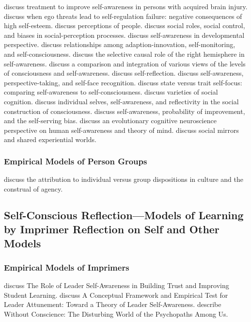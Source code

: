 \cite{goverover2007tis} discuss treatment to improve self-awareness in persons with acquired brain injury.
\cite{baumeister1993etl} discuss when ego threats lead to self-regulation failure: negative consequences of high self-esteem.
\cite{gilbert2005ocb} discuss perceptions of people.
\cite{ross2005bispc} discuss social roles, social control, and biases in social-perception processes.
\cite{hobson2006sad} discuss self-awareness in developmental perspective.
\cite{hutchinson2007saa} discuss relationships among adaption-innovation, self-monitoring, and self-consciousness.
\cite{keenan2007crr} discuss the selective causal role of the right hemisphere in self-awareness.
\cite{morin2004lca} discuss a comparison and integration of various views of the levels of consciousness and self-awareness.
\cite{silverman2008osr} discuss self-reflection.
\cite{smith2007sap} discuss self-awareness, perspective-taking, and self-face recognition.
\cite{soeiro2008svtsf} discuss state versus trait self-focus: comparing self-awareness to self-consciousness.
\cite{uhlmann2008vsc} discuss varieties of social cognition.
\cite{burns1998scc} discuss individual selves, self-awareness, and reflectivity in the social construction of consciousness.
\cite{duval2002sap} discuss self-awareness, probability of improvement, and the self-serving bias.
\cite{focquaert2008ecn} discuss an evolutionary cognitive neuroscience perspective on human self-awareness and theory of mind.
\cite{whitehead2001sma} discuss social mirrors and shared experiential worlds.


\subsubsection{Empirical Models of Person Groups}

\cite{menon2005cacoa} discuss the attribution to individual versus group dispositions in culture and the construal of agency.

\subsection{Self-Conscious Reflection---Models of Learning by Imprimer Reflection on Self and Other Models}

\subsubsection{Empirical Models of Imprimers}

\cite{hinton2008rlsa} discuss The Role of Leader Self-Awareness in Building Trust and Improving Student Learning.
\cite{taylor2007cfetla} discuss A Conceptual Framework and Empirical Test for Leader Attunement: Toward a Theory of Leader Self-Awareness.
\cite{hare1993wc} describe Without Conscience: The Disturbing World of the Psychopaths Among Us.


